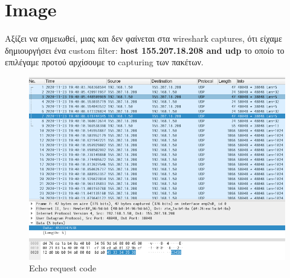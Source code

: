 \documentclass[12pt, a4paper]{article}
\begin{document}



\pagebreak
\tableofcontents



\vspace{3cm}

\section{Image}
Αξίζει να σημειωθεί, μιας και δεν φαίνεται στα wireshark captures, ότι είχαμε δημιουργήσει ένα custom filter: \textbf{host 155.207.18.208 and udp} το οποίο το επιλέγαμε προτού αρχίσουμε το capturing των πακέτων.


\begin{figure}[h!]
\centering
	\includegraphics[height=.4\textheight, width=\textwidth, keepaspectratio]{assets/wireshark/image1.png}
	\caption{Echo request code} 
\end{figure}
\end{document}
